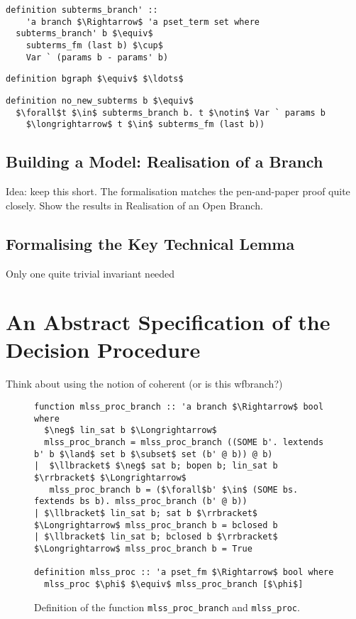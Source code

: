 \documentclass[sigplan,10pt,anonymous,review]{acmart}
\begin{document}
\begin{lstlisting}
definition subterms_branch' ::
    'a branch $\Rightarrow$ 'a pset_term set where
  subterms_branch' b $\equiv$
    subterms_fm (last b) $\cup$ 
    Var ` (params b - params' b)
\end{lstlisting}

\begin{lstlisting}
definition bgraph $\equiv$ $\ldots$ 
\end{lstlisting}

\begin{lstlisting}
definition no_new_subterms b $\equiv$
  $\forall$t $\in$ subterms_branch b. t $\notin$ Var ` params b
    $\longrightarrow$ t $\in$ subterms_fm (last b))
\end{lstlisting}

\subsection{Building a Model: Realisation of a Branch}
Idea: keep this short. The formalisation matches the pen-and-paper proof quite closely.
Show the results in Realisation of an Open Branch.

\subsection{Formalising the Key Technical Lemma}
Only one quite trivial invariant needed 

\section{An Abstract Specification of the Decision Procedure}
Think about using the notion of coherent (or is this wfbranch?)
\begin{figure*}
  \centering
\begin{lstlisting}
function mlss_proc_branch :: 'a branch $\Rightarrow$ bool where
  $\neg$ lin_sat b $\Longrightarrow$
  mlss_proc_branch = mlss_proc_branch ((SOME b'. lextends b' b $\land$ set b $\subset$ set (b' @ b)) @ b)
|  $\llbracket$ $\neg$ sat b; bopen b; lin_sat b $\rrbracket$ $\Longrightarrow$
   mlss_proc_branch b = ($\forall$b' $\in$ (SOME bs. fextends bs b). mlss_proc_branch (b' @ b))
| $\llbracket$ lin_sat b; sat b $\rrbracket$ $\Longrightarrow$ mlss_proc_branch b = bclosed b
| $\llbracket$ lin_sat b; bclosed b $\rrbracket$ $\Longrightarrow$ mlss_proc_branch b = True

definition mlss_proc :: 'a pset_fm $\Rightarrow$ bool where
  mlss_proc $\phi$ $\equiv$ mlss_proc_branch [$\phi$]
\end{lstlisting}
\caption{Definition of the function \lstinline|mlss_proc_branch| and \lstinline|mlss_proc|.}
\end{figure*}
\end{document}
